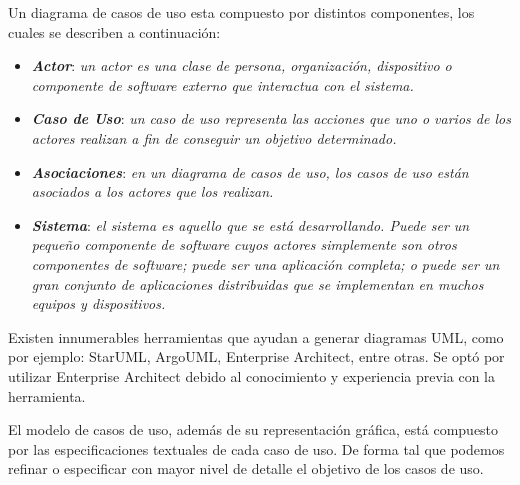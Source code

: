 \documentclass[11pt,oneside]{book}
\begin{document}
Un diagrama de casos de uso esta compuesto por distintos componentes, los cuales se describen a continuación:

\begin{itemize}
\item \textit{\textbf{Actor}}: \textit{un actor es una clase de persona, organización, dispositivo o componente de software externo que interactua con el sistema.}
\item \textit{\textbf{Caso de Uso}}: \textit{un caso de uso representa las acciones que uno o varios de los actores realizan a fin de conseguir un objetivo determinado.}
\item \textit{\textbf{Asociaciones}}: \textit{en un diagrama de casos de uso, los casos de uso están asociados a los actores que los realizan.}
\item \textit{\textbf{Sistema}}: \textit{el sistema es aquello que se está desarrollando. Puede ser un pequeño componente de software cuyos actores simplemente son otros componentes de software; puede ser una aplicación completa; o puede ser un gran conjunto de aplicaciones distribuidas que se implementan en muchos equipos y dispositivos.}
\end{itemize}

Existen innumerables herramientas que ayudan a generar diagramas UML, como por ejemplo: StarUML, ArgoUML, Enterprise Architect, entre otras. Se optó por utilizar Enterprise Architect debido al conocimiento y experiencia previa con la herramienta. 

El modelo de casos de uso, además de su representación gráfica, está compuesto por las especificaciones textuales de cada caso de uso. De forma tal que podemos refinar o especificar con mayor nivel de detalle el objetivo de los casos de uso.
\end{document}
